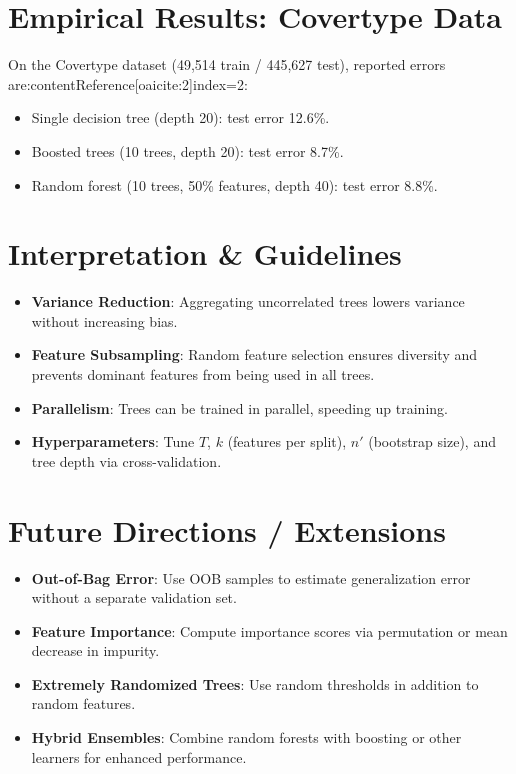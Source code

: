 \documentclass[11pt]{article}
\begin{document}
\section{Empirical Results: Covertype Data}
On the Covertype dataset (49{,}514 train / 445{,}627 test), reported errors are:contentReference[oaicite:2]{index=2}:
\begin{itemize}
  \item Single decision tree (depth 20): test error 12.6\%.
  \item Boosted trees (10 trees, depth 20): test error 8.7\%.
  \item Random forest (10 trees, 50\% features, depth 40): test error 8.8\%.
\end{itemize}

\section{Interpretation \& Guidelines}
\begin{itemize}
  \item \textbf{Variance Reduction}: Aggregating uncorrelated trees lowers variance without increasing bias.
  \item \textbf{Feature Subsampling}: Random feature selection ensures diversity and prevents dominant features from being used in all trees.
  \item \textbf{Parallelism}: Trees can be trained in parallel, speeding up training.
  \item \textbf{Hyperparameters}: Tune $T$, $k$ (features per split), $n'$ (bootstrap size), and tree depth via cross-validation.
\end{itemize}

\section{Future Directions / Extensions}
\begin{itemize}
  \item \textbf{Out-of-Bag Error}: Use OOB samples to estimate generalization error without a separate validation set.
  \item \textbf{Feature Importance}: Compute importance scores via permutation or mean decrease in impurity.
  \item \textbf{Extremely Randomized Trees}: Use random thresholds in addition to random features.
  \item \textbf{Hybrid Ensembles}: Combine random forests with boosting or other learners for enhanced performance.
\end{itemize}
\end{document}
